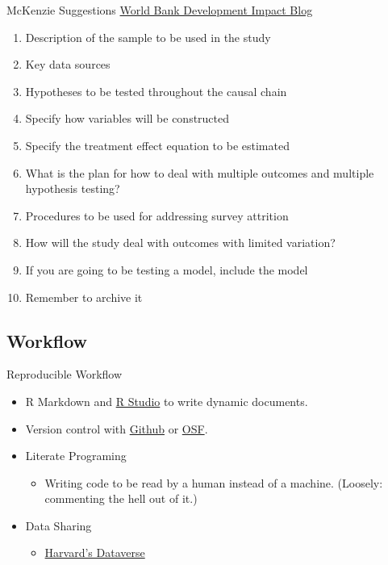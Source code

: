 \documentclass{beamer}
\begin{document}
\begin{frame}{McKenzie Suggestions}
\href{http://blogs.worldbank.org/impactevaluations/a-pre-analysis-plan-checklist}{World Bank Development Impact Blog}

\begin{enumerate}[<.->]
\item
  Description of the sample to be used in the study
\item
  Key data sources
\item
  Hypotheses to be tested throughout the causal chain
\item
  Specify how variables will be constructed
\item
  Specify the treatment effect equation to be estimated
\item
  What is the plan for how to deal with multiple outcomes and multiple
  hypothesis testing?
\item
  Procedures to be used for addressing survey attrition
\item
  How will the study deal with outcomes with limited variation?
\item
  If you are going to be testing a model, include the model
\item
  Remember to archive it
\end{enumerate}
\end{frame}

\subsection{Workflow}
\begin{frame}{Reproducible Workflow}
 \begin{itemize}
 \item R Markdown and \href{http://rstudio.com}{R Studio} to write dynamic documents.
 \item Version control with \href{http://www.github.com}{Github} or \href{http://osf.io}{OSF}. 
 \item Literate Programing
  \begin{itemize}
   \item Writing code to be read by a human instead of a machine. (Loosely: commenting the hell out of it.)
  \end{itemize} 
 \item Data Sharing
 \begin{itemize}
 \item \href{http://www.thedata.org}{Harvard's Dataverse}
 \end{itemize}
\end{itemize}
\end{frame}
\end{document}
